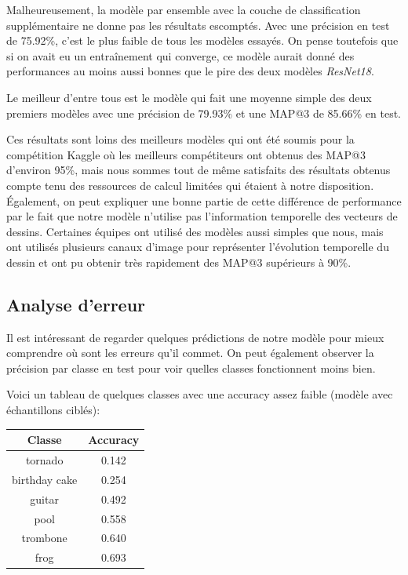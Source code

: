 Malheureusement, la modèle par ensemble avec la couche de classification supplémentaire ne donne pas les résultats escomptés.
Avec une précision en test de 75.92\%, c'est le plus faible de tous les modèles essayés. On pense toutefois que si on avait eu un entraînement qui converge, ce modèle aurait donné des performances au moins aussi bonnes que le pire des deux modèles \emph{ResNet18}.


Le meilleur d'entre tous est le modèle qui fait une moyenne simple des deux premiers modèles avec une précision de 79.93\% et une MAP@3 de 85.66\% en test.

Ces résultats sont loins des meilleurs modèles qui ont été soumis pour la compétition Kaggle où les meilleurs compétiteurs ont obtenus des MAP@3 d'environ 95\%, mais nous sommes tout de même satisfaits des résultats obtenus compte tenu des ressources de calcul limitées qui étaient à notre disposition.
Également, on peut expliquer une bonne partie de cette différence de performance par le fait que notre modèle n'utilise pas l'information temporelle des vecteurs de dessins. 
Certaines équipes ont utilisé des modèles aussi simples que nous, mais ont utilisés plusieurs canaux d'image pour représenter l'évolution temporelle du dessin et ont pu obtenir très rapidement des MAP@3 supérieurs à 90\%.


\subsection{Analyse d'erreur}
Il est intéressant de regarder quelques prédictions de notre modèle pour mieux comprendre où sont les erreurs qu'il commet. 
On peut également observer la précision par classe en test pour voir quelles classes fonctionnent moins bien.


Voici un tableau de quelques classes avec une accuracy assez faible (modèle avec échantillons ciblés):
\begin{center}
\begin{tabular}{|c|c|}
\hline
\textbf{Classe} & \textbf{Accuracy} \\ \hline
tornado & 0.142 \\ \hline
birthday cake & 0.254 \\ \hline
guitar & 0.492 \\ \hline
pool & 0.558 \\ \hline
trombone & 0.640 \\ \hline
frog & 0.693 \\ \hline
\end{tabular}
\end{center}




